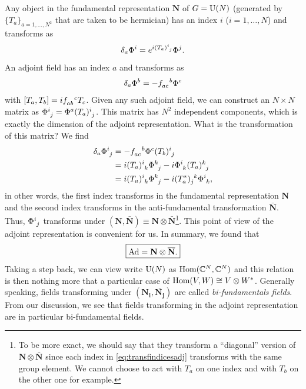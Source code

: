             Any object in the fundamental representation $\textbf{N}$ of $G=\text{U}(N)$ (generated by $\{T_a\}_{a=1,\dots,N^2}$ that are taken to be hermician) has an index $i$ ($i=1,\dots,N$) and transforms as
            \begin{equation}
                \delta_a\Phi^i= e^{i(T_a)\indices{^i_j}}\Phi^j.
            \end{equation}
            An adjoint field has an index $a$ and transforms as
            \begin{equation}
                \delta_a\Phi^b = -f\indices{_{ac}^b}\Phi^c
            \end{equation}
            with $[T_a,T_b]=if\indices{_{ab}^c}T_c$. Given any such adjoint field, we can construct an $N\times N$ matrix as $\Phi\indices{^i_j}=\Phi^a (T_a)\indices{^i_j}$. This matrix has $N^2$ independent components, which is exactly the dimension of the adjoint representation. What is the transformation of this matrix? We find
            \begin{align}
                \delta_a\Phi\indices{^i_j}&=-f\indices{_{ac}^b}\Phi^c (T_b)\indices{^i_j}\\
                &= i(T_a)\indices{^i_k}\Phi\indices{^k_j}-i\Phi\indices{^i_k}(T_a)\indices{^k_j}\\
                &= i(T_a)\indices{^i_k}\Phi\indices{^k_j}-i(T^*_a)\indices{_j^k}\Phi\indices{^i_k},\label{eq:transfindicesadj}
            \end{align}
            in other words, the first index transforms in the fundamental representation $\textbf{N}$ and the second index transforms in the anti-fundamental transformation $\bar{\textbf{N}}$. Thus, $\Phi\indices{^i_j}$ transforms under $(\textbf{N},\bar{\textbf{N}})\equiv\textbf{N}\otimes\bar{\textbf{N}}$\footnote{To be more exact, we should say that they transform a ``diagonal'' version of $\textbf{N}\otimes\bar{\textbf{N}}$ since each index in \eqref{eq:transfindicesadj} transforms with the same group element. We cannot choose to act with $T_a$ on one index and with $T_b$ on the other one for example.}. This point of view of the adjoint representation is convenient for us. In summary, we found that
            \begin{equation}
                \boxed{\text{Ad} = \textbf{N}\otimes\overline{\textbf{N}}.}\label{eq:bufundadjoint}
            \end{equation}
            Taking a step back, we can view write $\text{U}(N)$ as $\text{Hom}(\mathbb{C}^N,\mathbb{C}^N)$ and this relation is then nothing more that a particular case of $\text{Hom}(V,W)\cong V\otimes W^*$. Generally speaking, fields transforming under $(\boldsymbol{\textbf{N}_i},\bar{\boldsymbol{\textbf{N}_j}})$ are called \emph{bi-fundamentals fields}. From our discussion, we see that fields transforming in the adjoint representation are in particular bi-fundamental fields.

